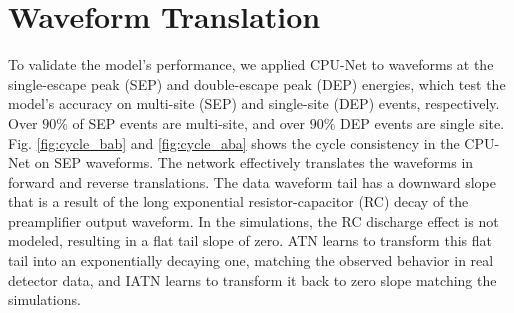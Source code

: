 

\section{Waveform Translation}
To validate the model’s performance, we applied CPU-Net to waveforms at the single-escape peak (SEP) and double-escape peak (DEP) energies, which test the model’s accuracy on multi-site (SEP) and single-site (DEP) events, respectively. Over $90\%$ of SEP events are multi-site, and over $90\%$ DEP events are single site. Fig. \ref{fig:cycle_bab} and \ref{fig:cycle_aba}  shows the cycle consistency in the CPU-Net on SEP waveforms. The network effectively translates the waveforms in forward and reverse translations. The data waveform tail has a downward slope that is a result of the long exponential resistor-capacitor (RC) decay of the preamplifier output waveform. In the {\siggen} simulations, the RC discharge effect is not modeled, resulting in a flat tail slope of zero. ATN learns to transform this flat tail into an exponentially decaying one, matching the observed behavior in real detector data, and IATN learns to transform it back to zero slope matching the simulations.


